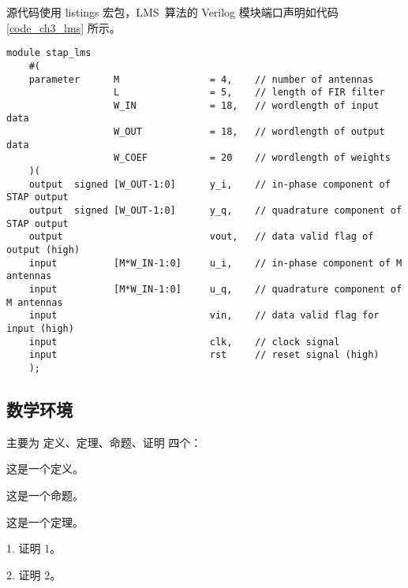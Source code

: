 源代码使用 listings 宏包，LMS~算法的 Verilog 模块端口声明如代码 \ref{code_ch3_lms} 所示。

{
    \begin{lstlisting}[caption={空时~LMS~算法~Verilog~模块端口声明},label={code_ch3_lms}]
    module stap_lms
    #(
    parameter      M                = 4,    // number of antennas
                   L                = 5,    // length of FIR filter
                   W_IN             = 18,   // wordlength of input data
                   W_OUT            = 18,   // wordlength of output data
                   W_COEF           = 20    // wordlength of weights
    )(
    output  signed [W_OUT-1:0]      y_i,    // in-phase component of STAP output
    output  signed [W_OUT-1:0]      y_q,    // quadrature component of STAP output
    output                          vout,   // data valid flag of output (high)
    input          [M*W_IN-1:0]     u_i,    // in-phase component of M antennas
    input          [M*W_IN-1:0]     u_q,    // quadrature component of M antennas
    input                           vin,    // data valid flag for input (high)
    input                           clk,    // clock signal
    input                           rst     // reset signal (high)
    );
    \end{lstlisting}
}

\subsection{数学环境}

主要为 定义、定理、命题、证明 四个：

\begin{Definition}
	这是一个定义。
\end{Definition}

\begin{Proposition}
	这是一个命题。
\end{Proposition}

\begin{Theorem}
	这是一个定理。
\end{Theorem}

\begin{Proof}
	1. 证明 1。

	2. 证明 2。
\end{Proof}